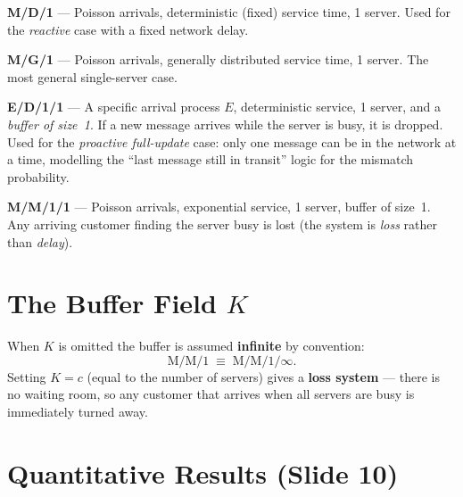 \vspace{0.5em}
 
\begin{insightbox}
\textbf{M/D/1} --- Poisson arrivals, deterministic (fixed) service time,
1 server. Used for the \emph{reactive} case with a fixed network delay.
\end{insightbox}
 
\vspace{0.5em}
 
\begin{insightbox}
\textbf{M/G/1} --- Poisson arrivals, generally distributed service time,
1 server. The most general single-server case.
\end{insightbox}
 
\vspace{0.5em}
 
\begin{insightbox}
\textbf{E/D/1/1} --- A specific arrival process $E$, deterministic service,
1 server, and a \emph{buffer of size~1}. If a new message arrives while the
server is busy, it is dropped. Used for the \emph{proactive full-update}
case: only one message can be in the network at a time, modelling the
``last message still in transit'' logic for the mismatch probability.
\end{insightbox}
 
\vspace{0.5em}
 
\begin{insightbox}
\textbf{M/M/1/1} --- Poisson arrivals, exponential service, 1 server,
buffer of size~1. Any arriving customer finding the server busy is lost
(the system is \emph{loss} rather than \emph{delay}).
\end{insightbox}
 
\section*{The Buffer Field $K$}
 
When $K$ is omitted the buffer is assumed \textbf{infinite} by convention:
\[
  \text{M/M/1} \;\equiv\; \text{M/M/1/}\infty.
\]
Setting $K = c$ (equal to the number of servers) gives a \textbf{loss system}
--- there is no waiting room, so any customer that arrives when all servers are
busy is immediately turned away.





\section{Quantitative Results (Slide 10)}
 
